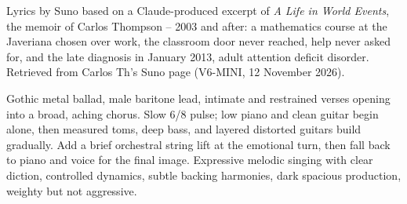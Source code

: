 
\label{sec:parked-beside-the-door}
\begin{notes}
Lyrics by Suno based on a Claude-produced excerpt of \emph{A Life in World Events}, the memoir of Carlos Thompson -- 2003 and after: a mathematics course at the Javeriana chosen over work, the classroom door never reached, help never asked for, and the late diagnosis in January 2013, adult attention deficit disorder. Retrieved from Carlos Th's Suno page (V6-MINI, 12 November 2026).
\end{notes}
\begin{style}
Gothic metal ballad, male baritone lead, intimate and restrained verses opening into a broad, aching chorus. Slow 6/8 pulse; low piano and clean guitar begin alone, then measured toms, deep bass, and layered distorted guitars build gradually. Add a brief orchestral string lift at the emotional turn, then fall back to piano and voice for the final image. Expressive melodic singing with clear diction, controlled dynamics, subtle backing harmonies, dark spacious production, weighty but not aggressive.
\end{style}
